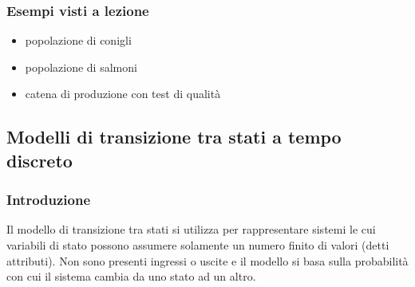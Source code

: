\subsubsection*{Esempi visti a lezione}
\begin{itemize}
	\item popolazione di conigli
	\item popolazione di salmoni
	\item catena di produzione con test di qualità
\end{itemize}

\newpage

\subsection{Modelli di transizione tra stati a tempo discreto}
\subsubsection*{Introduzione}
Il modello di transizione tra stati si utilizza per rappresentare sistemi le cui variabili di stato possono assumere solamente un
numero finito di valori (detti attributi). Non sono presenti ingressi o uscite e il modello si basa sulla probabilità con cui il
sistema cambia da uno stato ad un altro.

